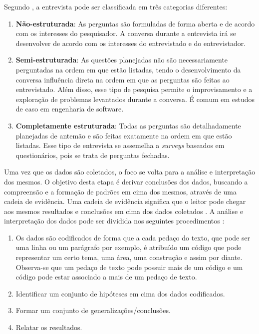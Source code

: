 Segundo , a entrevista pode ser classificada em três categorias diferentes:
\begin{enumerate}
	\item \textbf{Não-estruturada}: As perguntas são formuladas de forma aberta e de acordo com os interesses do pesquisador. A conversa durante a entrevista irá se desenvolver de acordo com os interesses do entrevistado e do entrevistador.
	\item \textbf{Semi-estruturada}: As questões planejadas não são necessariamente perguntadas na ordem em que estão listadas, tendo o desenvolvimento da conversa influência direta na ordem em que as perguntas são feitas ao entrevistado. Além disso, esse tipo de pesquisa permite o improvisamento e a exploração de problemas levantados durante a conversa. É comum em estudos de caso em engenharia de software.
	\item \textbf{Completamente estruturada}: Todas as perguntas são detalhadamente planejadas de antemão e são feitas exatamente na ordem em que estão listadas. Esse tipo de entrevista se assemelha a \textit{surveys} baseados em questionários, pois se trata de perguntas fechadas.
\end{enumerate}

Uma vez que os dados são coletados, o foco se volta para a análise e interpretação dos mesmos. O objetivo desta etapa é derivar conclusões dos dados, buscando a compreensão e a formação de padrões em cima dos mesmos, através de uma cadeia de evidência. Uma cadeia de evidência significa que o leitor pode chegar aos mesmos resultados e conclusões em cima dos dados coletados \cite{caseStudySE}. A análise e interpretação dos dados pode ser dividida nos seguintes procedimentos \cite{caseStudySE}:

\begin{enumerate}
	\item Os dados são codificados de forma que a cada pedaço do texto, que pode ser uma linha ou um parágrafo por exemplo, é atribuído um código que pode representar um certo tema, uma área, uma construção e assim por diante. Observa-se que um pedaço de texto pode possuir mais de um código e um código pode estar associado a mais de um pedaço de texto.
	\item Identificar um conjunto de hipóteses em cima dos dados codificados.
	\item Formar um conjunto de generalizações/conclusões.
	\item Relatar os resultados.
\end{enumerate}

